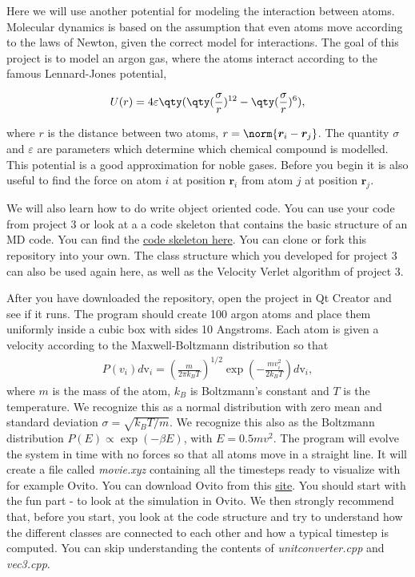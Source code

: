 \documentclass[%
oneside,                 %
final,                   %
10pt]{article}
\begin{document}
Here we will use another potential  for modeling the interaction between atoms.
Molecular dynamics is based on the assumption that even atoms move
according to the laws of Newton, given the correct model for
interactions. The goal of this project is to model an argon gas, where
the atoms interact according to the famous Lennard-Jones potential,

\begin{equation}
    U(r) = 4\varepsilon\qty(\qty(\frac{\sigma}{r})^{12} - \qty(\frac{\sigma}{r})^6), \label{eq:lj}
\end{equation}

where $r$ is the distance between two atoms,
$r=\norm{\bm{r}_i-\bm{r}_j}$. The quantity $\sigma$ and $\varepsilon$
are parameters which determine which chemical compound is
modelled. This potential is a good approximation for noble
gases. Before you begin it is also useful to find the force on atom
$i$ at position $\bm{r}_i$ from atom $j$ at position $\bm{r}_j$. 



We will also learn how to do write object oriented code. You can use your code 
from project 3 or look at a 
a code skeleton that contains the basic structure of an MD code.
You can find the \href{{https://github.com/andeplane/molecular-dynamics-fys3150}}{code skeleton
here}. You
can clone or fork this repository into your own.  The class structure
which you developed for project 3 can also be used again here, as well
as the Velocity Verlet algorithm of project 3.







After you have downloaded the repository, open the project in Qt
Creator and see if it runs. The program should create 100 argon atoms
and place them uniformly inside a cubic box with sides 10
Angstroms. Each atom is given a velocity according to the
Maxwell-Boltzmann distribution so that
\begin{align} 
P(v_i)d\mathrm{v}_i = \left(\frac{m}{2\pi k_B
T}\right)^{1/2} \exp\left(-\frac{m v_i^2}{2k_B T}\right)d\mathrm{v}_i,
\end{align} 
where $m$ is the mass of the atom, $k_B$ is
Boltzmann's constant and $T$ is the temperature. We recognize this as
a normal distribution with zero mean and standard deviation $\sigma =
\sqrt{k_B T/m}$. We recognize this also as the Boltzmann distribution $P(E) \propto \exp{(-\beta E)}$, with $E = 0.5mv^2$.
The program will evolve the system in time with no
forces so that all atoms move in a straight line. It will create a
file called \emph{movie.xyz} containing all the timesteps ready to
visualize with for example Ovito. You can download Ovito from this \href{{http://www.ovito.org/index.php/download}}{site}. You should start
with the fun part - to look at the simulation in Ovito. We then
strongly recommend that, before you start, you look at the code
structure and try to understand how the different classes are
connected to each other and how a typical timestep is computed. You
can skip understanding the contents of \emph{unitconverter.cpp} and \emph{vec3.cpp}.
\end{document}
